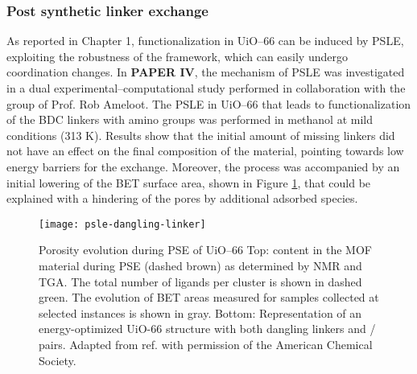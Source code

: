 \subsubsection*{Post synthetic linker exchange}
As reported in Chapter 1, functionalization in UiO--66 can be induced by PSLE, exploiting the robustness of the framework, which can easily undergo coordination changes. In \textbf{PAPER IV}, the mechanism of PSLE was investigated in a dual experimental--computational study performed in collaboration with the group of Prof. Rob Ameloot. The PSLE in UiO--66 that leads to functionalization of the BDC linkers with amino groups was performed in methanol at mild conditions (313 K). Results show that the initial amount of missing linkers did not have an effect on the final composition of the material, pointing towards low energy barriers for the exchange. Moreover, the process was accompanied by an initial lowering of the BET surface area, shown in Figure \ref{fig:psle-dangling-linker}, that could be explained with a hindering of the pores by additional adsorbed species. 
\npar
\begin{figure}[!htbp]
	\centering
	\texttt{[image: psle-dangling-linker]}
	\caption{Porosity evolution during PSE of UiO--66 Top:  content in the MOF material during PSE (dashed brown) as determined by NMR and TGA. The total number of ligands per cluster is shown in dashed green. The evolution of BET areas measured for samples collected at selected instances is shown in gray. Bottom: Representation of an energy-optimized UiO-66 structure with both dangling linkers and / pairs. Adapted from ref. \cite{marreiros2019active} with permission of the American Chemical Society.}
	\label{fig:psle-dangling-linker}
\end{figure}
